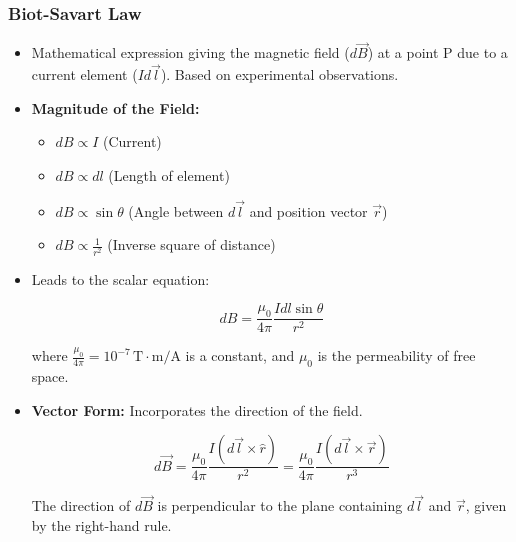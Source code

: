\transfade[duration=0.5]

\begin{frame}[t]
    \frametitle{\textcolor{deepnavy}{\textbf{Biot-Savart Law}}}
    \renewcommand{\familydefault}{\rmdefault}
    \small

    \begin{itemize}
      \item<+-> Mathematical expression giving the magnetic field ($d\vec{B}$) at a point P due to a current element ($I d\vec{l}$).   Based on experimental observations.

      \item<+-> \textbf{Magnitude of the Field:}
        \begin{itemize}
              \item $dB \propto I$ (Current)
              \item $dB \propto dl$ (Length of element)
              \item $dB \propto \sin\theta$ (Angle between $d\vec{l}$ and position vector $\vec{r}$)
              \item $dB \propto \frac{1}{r^2}$ (Inverse square of distance)
        \end{itemize}
    \item<+-> Leads to the scalar equation:
        \begin{tcolorbox}[colback=orange!8,colframe=accentorange,boxrule=0.5pt,arc=1mm,boxsep=2pt]
        \begin{equation*}
            dB = \frac{\mu_0}{4\pi} \frac{I dl \sin\theta}{r^2} \label{eq:biot_savart_scalar} \tag{Scalar}
        \end{equation*}
        \end{tcolorbox}
          where $\frac{\mu_0}{4\pi} = 10^{-7} \, \text{T}\cdot\text{m/A}$ is a constant, and $\mu_0$ is the permeability of free space.

    \vspace{1em}

      \item<+-> \textbf{Vector Form:} Incorporates the direction of the field.
        \begin{tcolorbox}[colback=orange!8,colframe=accentorange,boxrule=0.5pt,arc=1mm,boxsep=2pt]
        \begin{equation*}
             d\vec{B} = \frac{\mu_0}{4\pi} \frac{I (d\vec{l} \times \hat{r})}{r^2} = \frac{\mu_0}{4\pi} \frac{I (d\vec{l} \times \vec{r})}{r^3} \label{eq:biot_savart_vector} \tag{Vector}
        \end{equation*}
        \end{tcolorbox}
          The direction of $d\vec{B}$ is perpendicular to the plane containing $d\vec{l}$ and $\vec{r}$, given by the right-hand rule.
    \end{itemize}
\end{frame}

